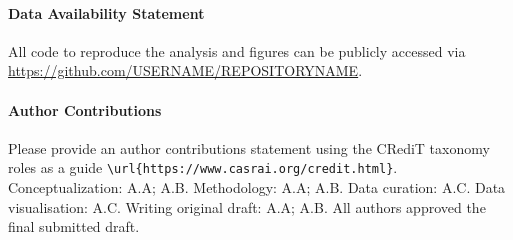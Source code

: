\documentclass[
  journal=pasa,
  manuscript=Research-Article,
  year=2025,
  volume=X,
]{cup-journal}
\begin{document}
\paragraph{Data Availability Statement}

All code to reproduce the analysis and figures can be publicly accessed via \url{https://github.com/USERNAME/REPOSITORYNAME}.

\paragraph{Author Contributions}
Please provide an author contributions statement using the CRediT taxonomy roles as a guide {\verb+\url{https://www.casrai.org/credit.html}+}. Conceptualization: A.A; A.B. Methodology: A.A; A.B. Data curation: A.C. Data visualisation: A.C. Writing original draft: A.A; A.B. All authors approved the final submitted draft.





\end{document}

